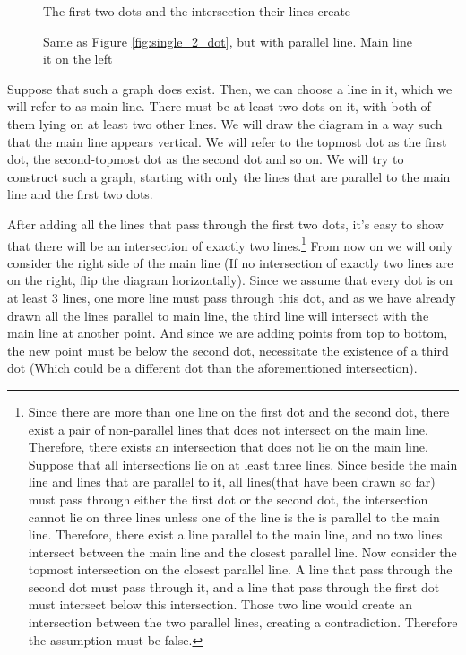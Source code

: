 \documentclass[a4paper, 12pt]{article}
\begin{document}
\begin{wrapfigure}{r}{0.25\textwidth}
    
    \caption{The first two dots and the intersection their lines create}
    \label{fig:single_2_dot}
    \vspace{1.5\baselineskip}
    
    \caption{Same as Figure \ref{fig:single_2_dot}, but with parallel line. Main line it on the left}
    \label{fig:double_2_dot}
    \vspace{-1.5\baselineskip}
\end{wrapfigure}
Suppose that such a graph does exist. Then, we can choose a line in it, which we will refer to as main line. There must be at least two dots on it, with both of them lying on at least two other lines. We will draw the diagram in a way such that the main line appears vertical. We will refer to the topmost dot as the first dot, the second-topmost dot as the second dot and so on. We will try to construct such a graph, starting with only the lines that are parallel to the main line and the first two dots.

After adding all the lines that pass through the first two dots, it's easy to show that there will be an intersection of exactly two lines.\footnote{Since there are more than one line on the first dot and the second dot, there exist a pair of non-parallel lines that does not intersect on the main line. Therefore, there exists an intersection that does not lie on the main line. Suppose that all intersections lie on at least three lines. Since beside the main line and lines that are parallel to it, all lines(that have been drawn so far) must pass through either the first dot or the second dot, the intersection cannot lie on three lines unless one of the line is the is parallel to the main line. Therefore, there exist a line parallel to the main line, and no two lines intersect between the main line and the closest parallel line. Now consider the topmost intersection on the closest parallel line. A line that pass through the second dot must pass through it, and a line that pass through the first dot must intersect below this intersection. Those two line would create an intersection between the two parallel lines, creating a contradiction. Therefore the assumption must be false. } From now on we will only consider the right side of the main line (If no intersection of exactly two lines are on the right, flip the diagram horizontally). Since we assume that every dot is on at least 3 lines, one more line must pass through this dot, and as we have already drawn all the lines parallel to main line, the third line will intersect with the main line at another point. And since we are adding points from top to bottom, the new point must be below the second dot, necessitate the existence of a third dot (Which could be a different dot than the aforementioned intersection).
\end{document}
